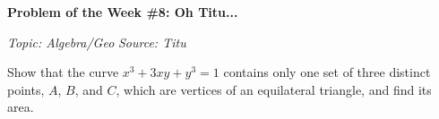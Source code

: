 \begin{potw}\vspace{5pt}
{\large\textbf{Problem of the Week \#8: Oh Titu...}}\vspace{5pt}

\textit{Topic: Algebra/Geo}\newline
\textit{Source: Titu}\V

Show that the curve $x^3 + 3xy + y^3 = 1$ contains only one set of three
distinct points, $A$, $B$, and $C$, which are vertices of an equilateral
triangle, and find its area.
\end{potw}\V
